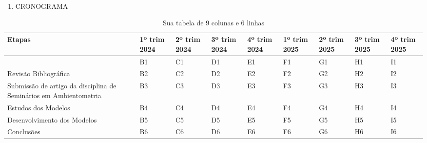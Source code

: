 \documentclass[
]{article}
\providecommand{\tightlist}{%
  \setlength{\itemsep}{0pt}\setlength{\parskip}{0pt}}
\begin{document}
\begin{enumerate}
\def\labelenumi{\arabic{enumi}.}
\setcounter{enumi}{5}
\tightlist
\item
  CRONOGRAMA
\end{enumerate}

\begin{table}[ht]
\centering
\begin{tabular}{|p{3cm}|p{1.5cm}|p{1.5cm}|p{1.5cm}|p{1.5cm}|p{1.5cm}|p{1.5cm}|p{1.5cm}|p{1.5cm}|}
\hline
Etapas & 1º trim 2024 & 2º trim 2024 & 3º trim 2024 & 4º trim 2024 & 1º trim 2025 & 2º trim 2025 & 3º trim 2025 & 4º trim 2025 \\ \hline
   & B1   & C1   & D1   & E1   & F1   & G1   & H1   & I1   \\ \hline
Revisão Bibliográfica   & B2   & C2   & D2   & E2   & F2   & G2   & H2   & I2   \\ \hline
Submissão de artigo da
disciplina de Seminários
em Ambientometria& B3   & C3   & D3   & E3   & F3   & G3   & H3   & I3   \\ \hline
Estudos dos Modelos   & B4   & C4   & D4   & E4   & F4   & G4   & H4   & I4   \\ \hline
Desenvolvimento dos
Modelos& B5   & C5   & D5   & E5   & F5   & G5   & H5   & I5   \\ \hline
Conclusões   & B6   & C6   & D6   & E6   & F6   & G6   & H6   & I6   \\ \hline
\end{tabular}
\caption{Sua tabela de 9 colunas e 6 linhas}
\end{table}
\end{document}
